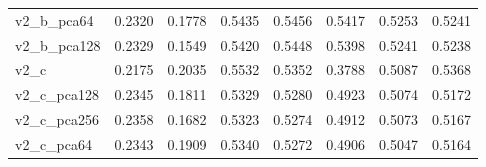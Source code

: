\begin{table}[ht]
\begin{tabular}{lrrrrrrr}
        v2\_b\_pca64  & 0.2320          & 0.1778          & 0.5435          & 0.5456          & 0.5417          & 0.5253          & 0.5241          \\
        v2\_b\_pca128 & 0.2329          & 0.1549          & 0.5420          & 0.5448          & 0.5398          & 0.5241          & 0.5238          \\
        v2\_c         & 0.2175          & 0.2035          & 0.5532          & 0.5352          & 0.3788          & 0.5087          & 0.5368          \\
        v2\_c\_pca128 & 0.2345          & 0.1811          & 0.5329          & 0.5280          & 0.4923          & 0.5074          & 0.5172          \\
        v2\_c\_pca256 & 0.2358          & 0.1682          & 0.5323          & 0.5274          & 0.4912          & 0.5073          & 0.5167          \\
        v2\_c\_pca64  & 0.2343          & 0.1909          & 0.5340          & 0.5272          & 0.4906          & 0.5047          & 0.5164          \\
        \bottomrule
    \end{tabular}
\end{table}
